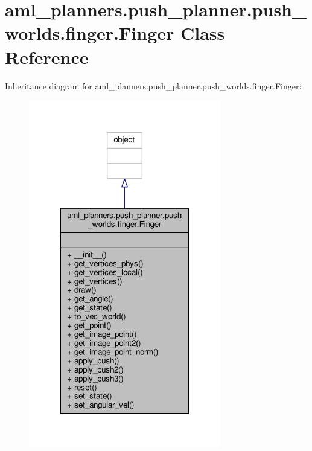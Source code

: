 \hypertarget{classaml__planners_1_1push__planner_1_1push__worlds_1_1finger_1_1_finger}{\section{aml\-\_\-planners.\-push\-\_\-planner.\-push\-\_\-worlds.\-finger.\-Finger Class Reference}
\label{classaml__planners_1_1push__planner_1_1push__worlds_1_1finger_1_1_finger}
}


Inheritance diagram for aml\-\_\-planners.\-push\-\_\-planner.\-push\-\_\-worlds.\-finger.\-Finger\-:
\nopagebreak
\begin{figure}[H]
\begin{center}
\leavevmode
\includegraphics[width=238pt]{classaml__planners_1_1push__planner_1_1push__worlds_1_1finger_1_1_finger__inherit__graph}
\end{center}
\end{figure}


